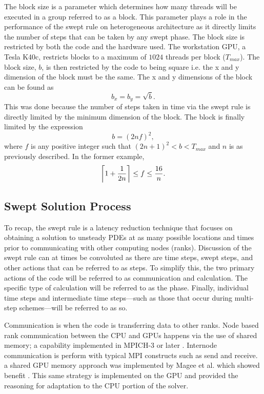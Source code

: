 \documentclass[review]{elsarticle}
\DeclarePairedDelimiter{\ceil}{\lceil}{\rceil}
\begin{document}
\par
The block size is a parameter which determines how many threads will be executed in a group referred to as a block. This parameter plays a role in the performance of the swept rule on heterogeneous architecture as it directly limits the number of steps that can be taken by any swept phase. The block size is restricted by both the code and the hardware used. The workstation GPU, a Tesla K40c, restricts blocks to a maximum of $1024$ threads per block ($T_{max}$).
The block size, $b$, is then restricted by the code to being square i.e. the x and y dimension of the block must be the same. The x and y dimensions of the block can be found as
\begin{equation}
    b_x = b_y = \sqrt{b}.
\end{equation}
This was done because the number of steps taken in time via the swept rule is directly limited by the minimum dimension of the block. The block is finally limited by the expression
\begin{equation}
    b  = (2nf)^2,
\end{equation}
where $f$ is any positive integer such that $(2n+1)^2 < b < T_{max}$ and $n$ is as previously described. In the former example,
\begin{equation}
  \ceil[\bigg]{1+\frac{1}{2n}} \leq f \leq \frac{16}{n}.
\end{equation}


\subsection{Swept Solution Process}
\par
To recap, the swept rule is a latency reduction technique that focuses on obtaining a solution to unsteady PDEs at as many possible locations and times prior to communicating with other computing nodes (ranks). Discussion of the swept rule can at times be convoluted as there are time steps, swept steps, and other actions that can be referred to as steps. To simplify this, the two primary actions of the code will be referred to as communication and calculation. The specific type of calculation will be referred to as the phase. Finally, individual time steps and intermediate time steps---such as those that occur during multi-step schemes---will be referred to as so. 

\par
 Communication is when the code is transferring data to other ranks. Node based rank communication between the CPU and GPUs happens via the use of shared memory; a capability implemented in MPICH-3 or later \cite{Hoefler2013MPIMemory}. Internode communication is perform with typical MPI constructs such as send and receive. a shared GPU memory approach was implemented by Magee et al. which showed benefit \cite{Magee2018AcceleratingDecomposition}. This same strategy is implemented on the GPU and provided the reasoning for adaptation to the CPU portion of the solver. 
 
\end{document}
